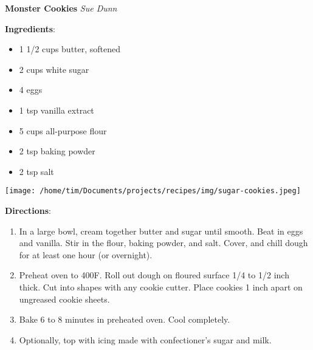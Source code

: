 \documentclass[11pt, twoside, openany]{book}
\begin{document}
\noindent\begin{minipage}[t]{\linewidth}%
{\Large\textbf{Monster Cookies}} \label{monster-cookies}\hfill\textit{Sue Dunn}\\
\noindent\begin{minipage}[t]{0.78\linewidth}%
\textbf{Ingredients}:\vspace{-3mm}
\begin{multicols}{2}
\begin{itemize}\setlength\itemsep{-1mm}
\item 1 1/2 cups butter, softened
\item 2 cups white sugar
\item 4 eggs
\item 1 tsp vanilla extract
\item 5 cups all-purpose flour
\item 2 tsp baking powder
\item 2 tsp salt
\end{itemize}
\end{multicols}
\end{minipage}
\noindent\begin{minipage}[t]{0.18\linewidth}
\centering \strut\vspace*{-\baselineskip}\newline
\texttt{[image: /home/tim/Documents/projects/recipes/img/sugar-cookies.jpeg]}\\
\end{minipage}\vspace{3mm}
\textbf{Directions}:
\vspace{-3mm}\begin{enumerate}\setlength\itemsep{-1mm}
\item In a large bowl, cream together butter and sugar until smooth. Beat in eggs and vanilla. Stir in the flour, baking powder, and salt. Cover, and chill dough for at least one hour (or overnight).
\item Preheat oven to 400F. Roll out dough on floured surface 1/4 to 1/2 inch thick. Cut into shapes with any cookie cutter. Place cookies 1 inch apart on ungreased cookie sheets.
\item Bake 6 to 8 minutes in preheated oven. Cool completely.
\item Optionally, top with icing made with confectioner's sugar and milk.
\end{enumerate}
\end{minipage}\vspace{8mm}
\end{document}
